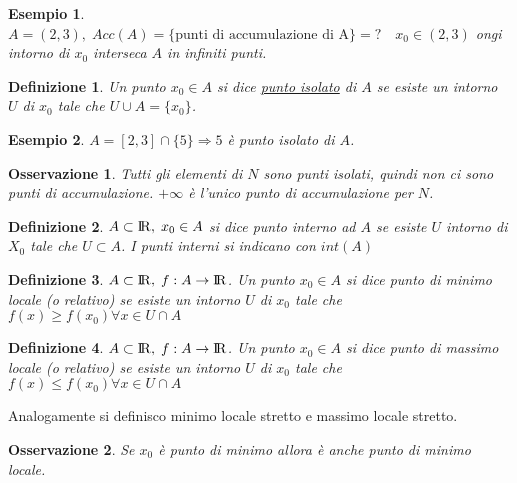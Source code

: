 \documentclass[12pt, a4paper]{article}
\theoremstyle{break}
\newtheorem{definition}{Definizione}[subsection]
\newtheorem{example}{Esempio}[subsection]
\newtheorem{observation}{Osservazione}[subsection]
\newcommand\R{{\rm I\!R}}
\begin{document}
    \begin{example}
        $A = (2,3),\; Acc(A) = \{\text{punti di accumulazione di A}\} = ?\quad x_0\in(2,3)$
        ongi intorno di $x_0$ interseca $A$ in infiniti punti.
        \begin{figure}[!htb]
            \centering
        \end{figure}
    \end{example}
    \begin{definition}
        Un punto $x_0\in A$ si dice \underline{punto isolato} di $A$ se esiste un intorno $U$ di $x_0$ tale che $U\cup A = \{x_0\}$.
    \end{definition}
    \begin{example}
        $A = [2,3]\cap\{5\} \Rightarrow 5$ è punto isolato di $A$.
    \end{example}
    \begin{observation}
        Tutti gli elementi di $N$ sono punti isolati, quindi non ci sono punti di accumulazione.\newline
        $+\infty$ è l'unico punto di accumulazione per $N$.
    \end{observation}
    \begin{definition}
        $A\subset\R,\; x_0 \in A$ si dice punto interno ad $A$ se esiste $U$ intorno di $X_0$ tale che $U\subset A$. I punti interni si indicano con $int(A)$
    \end{definition}
    \begin{definition}
        $A\subset\R,\;f:A\rightarrow\R$. Un punto $x_0\in A$ si dice punto di minimo locale (o relativo) se esiste un intorno $U$ di $x_0$ tale che $f(x)\geq f(x_0) \forall x\in U\cap A$
    \end{definition}
    \begin{definition}
        $A\subset\R,\;f:A\rightarrow\R$. Un punto $x_0\in A$ si dice punto di massimo locale (o relativo) se esiste un intorno $U$ di $x_0$ tale che $f(x)\leq f(x_0) \forall x\in U\cap A$
    \end{definition}
    Analogamente si definisco minimo locale stretto e massimo locale stretto.
    \begin{observation}
        Se $x_0$ è punto di minimo allora è anche punto di minimo locale.
    \end{observation}
    \newpage
\end{document}
